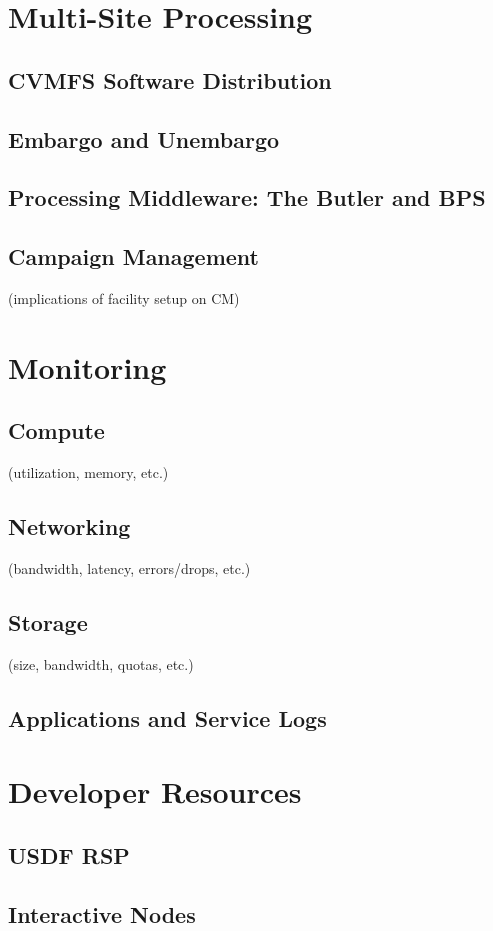 \section{Multi-Site Processing}
	\subsection{CVMFS Software Distribution}
	\subsection{Embargo and Unembargo}
        \subsection{Processing Middleware: The Butler and BPS}
	\subsection{Campaign Management}
	(implications of facility setup on CM)
\section{Monitoring}
	\subsection{Compute}
	(utilization, memory, etc.)
	\subsection{Networking}
	(bandwidth, latency, errors/drops, etc.)
	\subsection{Storage}
	(size, bandwidth, quotas, etc.)
	\subsection{Applications and Service Logs}
\section{Developer Resources}
	\subsection{USDF RSP}
	\subsection{Interactive Nodes}

